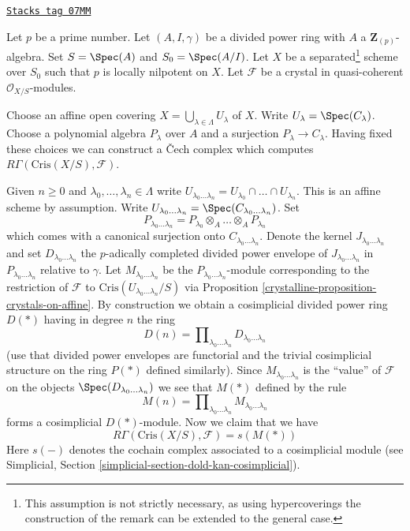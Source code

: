 \begin{remark}

\label{crystalline-remark-cech-complex}
\href{https://stacks.math.columbia.edu/tag/07MM}{\texttt{Stacks tag 07MM}}

Let $p$ be a prime number. Let $(A, I, \gamma)$ be a divided power
ring with $A$ a $\mathbf{Z}_{(p)}$-algebra. Set $S = \Spec(A)$ and
$S_0 = \Spec(A/I)$. Let $X$ be a separated\footnote{This assumption is
not strictly necessary, as using hypercoverings the construction of the
remark can be extended to the general case.} scheme over
$S_0$ such that $p$ is locally nilpotent on $X$. Let $\mathcal{F}$ be a
crystal in quasi-coherent $\mathcal{O}_{X/S}$-modules.

\medskip\noindent
Choose an affine open covering
$X = \bigcup_{\lambda \in \Lambda} U_\lambda$ of $X$.
Write $U_\lambda = \Spec(C_\lambda)$. Choose a polynomial algebra
$P_\lambda$ over $A$ and a surjection $P_\lambda \to C_\lambda$.
Having fixed these choices we can construct a {\v C}ech complex which
computes $R\Gamma(\text{Cris}(X/S), \mathcal{F})$.

\medskip\noindent
Given $n \geq 0$ and $\lambda_0, \ldots, \lambda_n \in \Lambda$
write $U_{\lambda_0 \ldots \lambda_n} = U_{\lambda_0} \cap \ldots
\cap U_{\lambda_n}$. This is an affine scheme by assumption. Write
$U_{\lambda_0 \ldots \lambda_n} = \Spec(C_{\lambda_0 \ldots \lambda_n})$.
Set
$$
P_{\lambda_0 \ldots \lambda_n} =
P_{\lambda_0} \otimes_A \ldots \otimes_A P_{\lambda_n}
$$
which comes with a canonical surjection onto $C_{\lambda_0 \ldots \lambda_n}$.
Denote the kernel $J_{\lambda_0 \ldots \lambda_n}$ and set
$D_{\lambda_0 \ldots \lambda_n}$
the $p$-adically completed divided power envelope of
$J_{\lambda_0 \ldots \lambda_n}$ in $P_{\lambda_0 \ldots \lambda_n}$
relative to $\gamma$. Let $M_{\lambda_0 \ldots \lambda_n}$ be the
$P_{\lambda_0 \ldots \lambda_n}$-module corresponding
to the restriction of $\mathcal{F}$ to
$\text{Cris}(U_{\lambda_0 \ldots \lambda_n}/S)$ via
Proposition \ref{crystalline-proposition-crystals-on-affine}.
By construction we obtain a cosimplicial divided power ring $D(*)$
having in degree $n$ the ring
$$
D(n) =
\prod\nolimits_{\lambda_0 \ldots \lambda_n}
D_{\lambda_0 \ldots \lambda_n}
$$
(use that divided power envelopes are functorial and the trivial
cosimplicial structure on the ring $P(*)$ defined similarly).
Since $M_{\lambda_0 \ldots \lambda_n}$ is the ``value'' of $\mathcal{F}$
on the objects $\Spec(D_{\lambda_0 \ldots \lambda_n})$ we see that
$M(*)$ defined by the rule
$$
M(n) = \prod\nolimits_{\lambda_0 \ldots \lambda_n}
M_{\lambda_0 \ldots \lambda_n}
$$
forms a cosimplicial $D(*)$-module. Now we claim that we have
$$
R\Gamma(\text{Cris}(X/S), \mathcal{F}) = s(M(*))
$$
Here $s(-)$ denotes the cochain complex associated to a cosimplicial
module (see
Simplicial, Section \ref{simplicial-section-dold-kan-cosimplicial}).


\end{remark}
